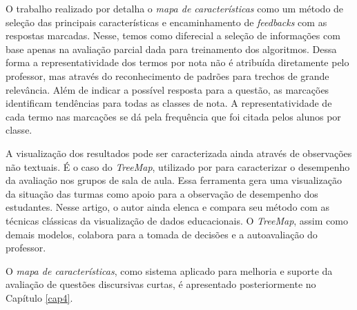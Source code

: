 O trabalho realizado por  detalha o \textit{mapa de características} como um método de seleção das principais características e encaminhamento de \textit{feedbacks} com as respostas marcadas. Nesse, temos como diferecial a seleção de informações com base apenas na avaliação parcial dada para treinamento dos algoritmos. Dessa forma a representatividade dos termos por nota não é atribuída diretamente pelo professor, mas através do reconhecimento de padrões para trechos de grande relevância. Além de indicar a possível resposta para a questão, as marcações identificam tendências para todas as classes de nota. A representatividade de cada termo nas marcações se dá pela frequência que foi citada pelos alunos por classe.

A visualização dos resultados pode ser caracterizada ainda através de observações não textuais. É o caso do \textit{TreeMap}, utilizado por  para caracterizar o desempenho da avaliação nos grupos de sala de aula. Essa ferramenta gera uma visualização da situação das turmas como apoio para a observação de desempenho dos estudantes. Nesse artigo, o autor ainda elenca e compara seu método com as técnicas clássicas da visualização de dados educacionais. O \textit{TreeMap}, assim como demais modelos, colabora para a tomada de decisões e a autoavaliação do professor.

O \textit{mapa de características}, como sistema aplicado para melhoria e suporte da avaliação de questões discursivas curtas, é apresentado posteriormente no Capítulo \ref{cap4}.